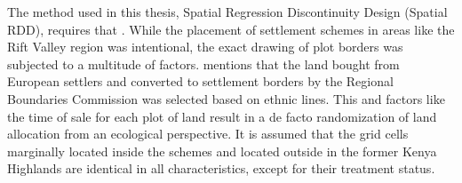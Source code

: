The method used in this thesis, Spatial Regression Discontinuity Design (Spatial RDD), requires that
 \parencite{keeleGeographicBoundariesRegression2015}.
While the placement of settlement schemes in areas like the Rift Valley region was intentional, the exact drawing of plot borders was subjected to a multitude of factors.
\textcite{leoLandClassKenya1984} mentions that the land bought from European settlers and converted to settlement borders by the Regional Boundaries Commission was selected based on ethnic lines.
This and factors like the time of sale for each plot of land result in a de facto randomization of land allocation from an ecological perspective.
It is assumed that the grid cells marginally located inside the schemes and located outside in the former Kenya Highlands are identical in all characteristics, except for their treatment status.